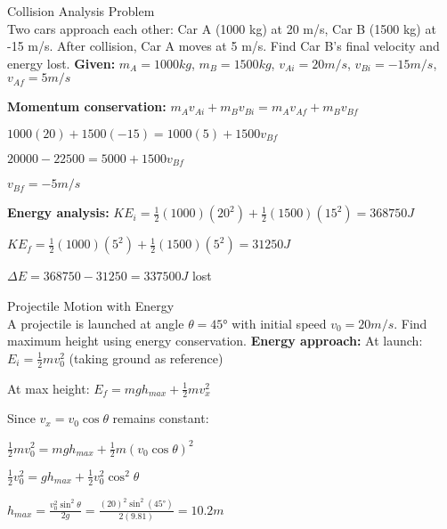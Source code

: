 \begin{example2}{Collision Analysis Problem}\\
    Two cars approach each other: Car A (1000 kg) at 20 m/s, Car B (1500 kg) at -15 m/s. After collision, Car A moves at 5 m/s. Find Car B's final velocity and energy lost.
    \tcblower
    \textbf{Given:} $m_A = 1000kg$, $m_B = 1500kg$, $v_{Ai} = 20m/s$, $v_{Bi} = -15m/s$, $v_{Af} = 5m/s$
    
    \textbf{Momentum conservation:}
    $m_Av_{Ai} + m_Bv_{Bi} = m_Av_{Af} + m_Bv_{Bf}$
    
    $1000(20) + 1500(-15) = 1000(5) + 1500v_{Bf}$
    
    $20000 - 22500 = 5000 + 1500v_{Bf}$
    
    $v_{Bf} = -5m/s$
    
    \textbf{Energy analysis:}
    $KE_i = \frac{1}{2}(1000)(20^2) + \frac{1}{2}(1500)(15^2) = 368750J$
    
    $KE_f = \frac{1}{2}(1000)(5^2) + \frac{1}{2}(1500)(5^2) = 31250J$
    
    $\Delta E = 368750 - 31250 = 337500J$ lost
\end{example2}

\begin{example2}{Projectile Motion with Energy}\\
    A projectile is launched at angle $\theta = 45°$ with initial speed $v_0 = 20m/s$. Find maximum height using energy conservation.
    \tcblower
    \textbf{Energy approach:}
    At launch: $E_i = \frac{1}{2}mv_0^2$ (taking ground as reference)
    
    At max height: $E_f = mgh_{max} + \frac{1}{2}mv_x^2$
    
    Since $v_x = v_0\cos\theta$ remains constant:
    
    $\frac{1}{2}mv_0^2 = mgh_{max} + \frac{1}{2}m(v_0\cos\theta)^2$
    
    $\frac{1}{2}v_0^2 = gh_{max} + \frac{1}{2}v_0^2\cos^2\theta$
    
    $h_{max} = \frac{v_0^2\sin^2\theta}{2g} = \frac{(20)^2\sin^2(45°)}{2(9.81)} = 10.2m$
\end{example2}